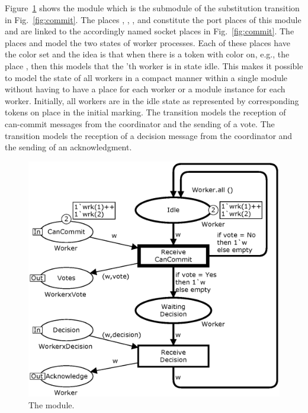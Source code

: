 Figure~\ref{fig:worker} shows the  module which is
the submodule of the  substitution transition in
Fig.~\ref{fig:commit}. The places ,
, , and 
constitute the port places of this module and are linked to the
accordingly named socket places in Fig.~\ref{fig:commit}. The places
 and  model the two states of
worker processes. Each of these places have the color set
 and the idea is that when there is a token with color
 on, e.g., the place , then this models
that the 'th worker is in state idle. This makes it possible to model
the state of all workers in a compact manner within a single module
without having to have a place for each worker or a module instance
for each worker. Initially, all workers are in the idle state as
represented by corresponding tokens on place  in the
initial marking. The transition  models the
reception of can-commit messages from the coordinator and the sending
of a vote. The transition  models the
reception of a decision message from the coordinator and the sending
of an acknowledgment.

\begin{figure}[]
\centering
\includegraphics[scale=.43]{figures/Workers.eps}
\caption{The  module.}
\label{fig:worker}
\end{figure}

